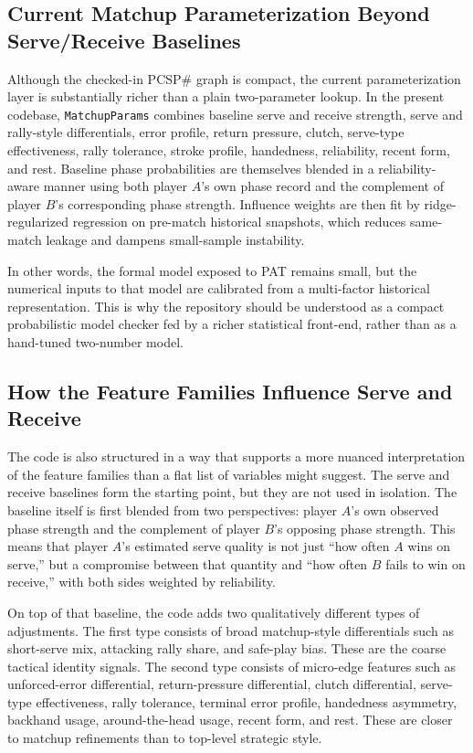 \documentclass{article}
\begin{document}
\subsection*{Current Matchup Parameterization Beyond Serve/Receive Baselines}
Although the checked-in PCSP\# graph is compact, the current parameterization layer is substantially richer than a plain two-parameter lookup. In the present codebase, \texttt{MatchupParams} combines baseline serve and receive strength, serve and rally-style differentials, error profile, return pressure, clutch, serve-type effectiveness, rally tolerance, stroke profile, handedness, reliability, recent form, and rest. Baseline phase probabilities are themselves blended in a reliability-aware manner using both player \(A\)'s own phase record and the complement of player \(B\)'s corresponding phase strength. Influence weights are then fit by ridge-regularized regression on pre-match historical snapshots, which reduces same-match leakage and dampens small-sample instability.

In other words, the formal model exposed to PAT remains small, but the numerical inputs to that model are calibrated from a multi-factor historical representation. This is why the repository should be understood as a compact probabilistic model checker fed by a richer statistical front-end, rather than as a hand-tuned two-number model.

\subsection*{How the Feature Families Influence Serve and Receive}
The code is also structured in a way that supports a more nuanced interpretation of the feature families than a flat list of variables might suggest. The serve and receive baselines form the starting point, but they are not used in isolation. The baseline itself is first blended from two perspectives: player \(A\)'s own observed phase strength and the complement of player \(B\)'s opposing phase strength. This means that player \(A\)'s estimated serve quality is not just ``how often \(A\) wins on serve,'' but a compromise between that quantity and ``how often \(B\) fails to win on receive,'' with both sides weighted by reliability.

On top of that baseline, the code adds two qualitatively different types of adjustments. The first type consists of broad matchup-style differentials such as short-serve mix, attacking rally share, and safe-play bias. These are the coarse tactical identity signals. The second type consists of micro-edge features such as unforced-error differential, return-pressure differential, clutch differential, serve-type effectiveness, rally tolerance, terminal error profile, handedness asymmetry, backhand usage, around-the-head usage, recent form, and rest. These are closer to matchup refinements than to top-level strategic style.
\end{document}
